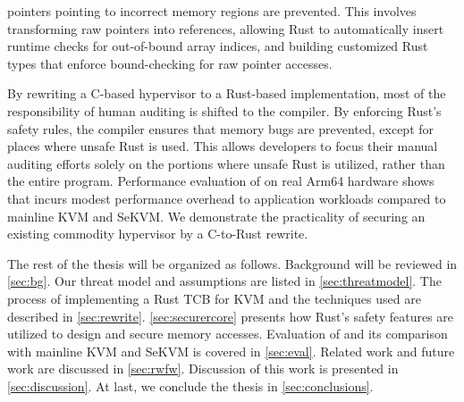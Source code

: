 pointers pointing to incorrect memory regions are prevented.
This involves transforming raw pointers into references, allowing Rust to
automatically insert runtime checks for out-of-bound array indices, and
building customized Rust types that enforce bound-checking for raw pointer
accesses.


By rewriting a C-based hypervisor to a Rust-based implementation,
most of the responsibility of human auditing is shifted to the compiler.
By enforcing Rust's safety rules, the compiler ensures that memory bugs are
prevented, except for places where unsafe Rust is used.
This allows developers to focus their manual auditing efforts solely on the
portions where unsafe Rust is utilized, rather than the entire program.
Performance evaluation of \rustsec{} on real Arm64 hardware shows that
\rustsec{} incurs modest performance overhead to application workloads
compared to mainline KVM and SeKVM. We demonstrate the practicality of
securing an existing commodity hypervisor by a C-to-Rust rewrite.

The rest of the thesis will be organized as follows. Background
will be reviewed in \autoref{sec:bg}. Our threat model and assumptions are
listed in \autoref{sec:threatmodel}. The process of implementing a Rust TCB
for KVM and the techniques used are described in \autoref{sec:rewrite}.
\autoref{sec:securercore} presents how Rust's safety features are utilized to
design and secure \rustcore{} memory accesses.
Evaluation of \rustsec{} and its comparison with mainline KVM and SeKVM is
covered in \autoref{sec:eval}. Related work and future work are discussed in
\autoref{sec:rwfw}. Discussion of this work is presented in \autoref{sec:discussion}.
At last, we conclude the thesis in \autoref{sec:conclusions}.
